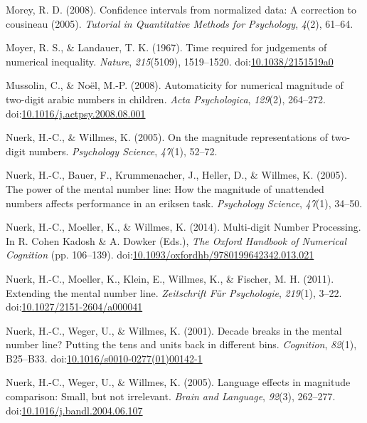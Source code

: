 \documentclass[english,man]{apa6}
\theoremstyle{definition}
\theoremstyle{definition}
\theoremstyle{definition}
\theoremstyle{remark}
\begin{document}
\hypertarget{ref-morey2008}{}
Morey, R. D. (2008). Confidence intervals from normalized data: A
correction to cousineau (2005). \emph{Tutorial in Quantitative Methods
for Psychology}, \emph{4}(2), 61--64.

\hypertarget{ref-moyer1967}{}
Moyer, R. S., \& Landauer, T. K. (1967). Time required for judgements of
numerical inequality. \emph{Nature}, \emph{215}(5109), 1519--1520.
doi:\href{https://doi.org/10.1038/2151519a0}{10.1038/2151519a0}

\hypertarget{ref-mussolin2008}{}
Mussolin, C., \& Noël, M.-P. (2008). Automaticity for numerical
magnitude of two-digit arabic numbers in children. \emph{Acta
Psychologica}, \emph{129}(2), 264--272.
doi:\href{https://doi.org/10.1016/j.actpsy.2008.08.001}{10.1016/j.actpsy.2008.08.001}

\hypertarget{ref-nuerk2005}{}
Nuerk, H.-C., \& Willmes, K. (2005). On the magnitude representations of
two-digit numbers. \emph{Psychology Science}, \emph{47}(1), 52--72.

\hypertarget{ref-nuerk2005power}{}
Nuerk, H.-C., Bauer, F., Krummenacher, J., Heller, D., \& Willmes, K.
(2005). The power of the mental number line: How the magnitude of
unattended numbers affects performance in an eriksen task.
\emph{Psychology Science}, \emph{47}(1), 34--50.

\hypertarget{ref-nuerk2014chapter}{}
Nuerk, H.-C., Moeller, K., \& Willmes, K. (2014). Multi-digit Number
Processing. In R. Cohen Kadosh \& A. Dowker (Eds.), \emph{The Oxford
Handbook of Numerical Cognition} (pp. 106--139).
doi:\href{https://doi.org/10.1093/oxfordhb/9780199642342.013.021}{10.1093/oxfordhb/9780199642342.013.021}

\hypertarget{ref-nuerk2011}{}
Nuerk, H.-C., Moeller, K., Klein, E., Willmes, K., \& Fischer, M. H.
(2011). Extending the mental number line. \emph{Zeitschrift Für
Psychologie}, \emph{219}(1), 3--22.
doi:\href{https://doi.org/10.1027/2151-2604/a000041}{10.1027/2151-2604/a000041}

\hypertarget{ref-nuerk2001}{}
Nuerk, H.-C., Weger, U., \& Willmes, K. (2001). Decade breaks in the
mental number line? Putting the tens and units back in different bins.
\emph{Cognition}, \emph{82}(1), B25--B33.
doi:\href{https://doi.org/10.1016/s0010-0277(01)00142-1}{10.1016/s0010-0277(01)00142-1}

\hypertarget{ref-nuerk2005language}{}
Nuerk, H.-C., Weger, U., \& Willmes, K. (2005). Language effects in
magnitude comparison: Small, but not irrelevant. \emph{Brain and
Language}, \emph{92}(3), 262--277.
doi:\href{https://doi.org/10.1016/j.bandl.2004.06.107}{10.1016/j.bandl.2004.06.107}
\end{document}
